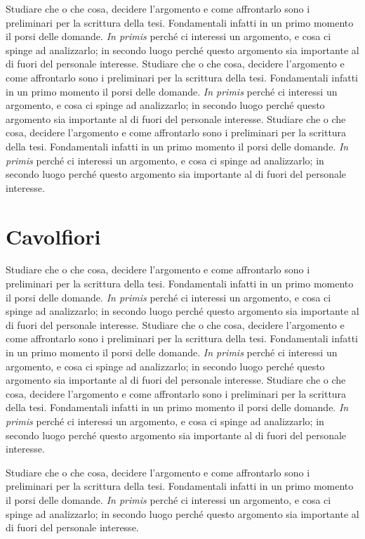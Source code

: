 \documentclass[12pt,a4paper,openright, oneside]{book}
\begin{document}
Studiare che o che cosa, decidere l'argomento e come affrontarlo sono i preliminari per la scrittura della tesi. Fondamentali infatti in un primo momento il porsi delle domande. \textit{In primis} perché ci interessi un argomento, e cosa ci spinge ad analizzarlo; in secondo luogo perché questo argomento sia importante al di fuori del personale interesse. Studiare che o che cosa, decidere l'argomento e come affrontarlo sono i preliminari per la scrittura della tesi. Fondamentali infatti in un primo momento il porsi delle domande. \textit{In primis} perché ci interessi un argomento, e cosa ci spinge ad analizzarlo; in secondo luogo perché questo argomento sia importante al di fuori del personale interesse. Studiare che o che cosa, decidere l'argomento e come affrontarlo sono i preliminari per la scrittura della tesi. Fondamentali infatti in un primo momento il porsi delle domande. \textit{In primis} perché ci interessi un argomento, e cosa ci spinge ad analizzarlo; in secondo luogo perché questo argomento sia importante al di fuori del personale interesse. 


\chapter*{Cavolfiori}
\renewcommand{\thechapter}{\Roman{chapter}}
\renewcommand{\thesection}{\thechapter \Roman{section}}

Studiare che o che cosa, decidere l'argomento e come affrontarlo sono i preliminari per la scrittura della tesi. Fondamentali infatti in un primo momento il porsi delle domande. \textit{In primis} perché ci interessi un argomento, e cosa ci spinge ad analizzarlo; in secondo luogo perché questo argomento sia importante al di fuori del personale interesse. Studiare che o che cosa, decidere l'argomento e come affrontarlo sono i preliminari per la scrittura della tesi. Fondamentali infatti in un primo momento il porsi delle domande. \textit{In primis} perché ci interessi un argomento, e cosa ci spinge ad analizzarlo; in secondo luogo perché questo argomento sia importante al di fuori del personale interesse. 
Studiare che o che cosa, decidere l'argomento e come affrontarlo sono i preliminari per la scrittura della tesi. Fondamentali infatti in un primo momento il porsi delle domande. \textit{In primis} perché ci interessi un argomento, e cosa ci spinge ad analizzarlo; in secondo luogo perché questo argomento sia importante al di fuori del personale interesse. 

Studiare che o che cosa, decidere l'argomento e come affrontarlo sono i preliminari per la scrittura della tesi. Fondamentali infatti in un primo momento il porsi delle domande. \textit{In primis} perché ci interessi un argomento, e cosa ci spinge ad analizzarlo; in secondo luogo perché questo argomento sia importante al di fuori del personale interesse. 
\end{document}
